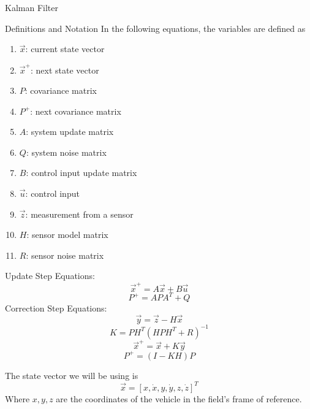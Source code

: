 \documentclass[12pt]{article}
\begin{document}
\begin{section}{Kalman Filter}
\begin{subsection}{Definitions and Notation}
In the following equations, the variables are defined as
\begin{enumerate}
\item $\vec{x}$: current state vector
\item $\vec{x}^+$: next state vector
\item $P$: covariance matrix
\item $P^+$: next covariance matrix
\item $A$: system update matrix
\item $Q$: system noise matrix
\item $B$: control input update matrix
\item $\vec{u}$: control input
\item $\vec{z}$: measurement from a sensor
\item $H$: sensor model matrix
\item $R$: sensor noise matrix
\end{enumerate}
Update Step Equations:
\begin{equation}
\vec{x}^+ = A\vec{x} + B\vec{u}
\end{equation}
\begin{equation}
P^+ = APA^T + Q
\end{equation}
Correction Step Equations:
\begin{equation}
\vec{y} = \vec{z} - H\vec{x}
\end{equation}
\begin{equation}
K = PH^T(HPH^T+R)^{-1}
\end{equation}
\begin{equation}
\vec{x}^+ = \vec{x} + K\vec{y}
\end{equation}
\begin{equation}
P^+ = (I - KH)P
\end{equation}


The state vector we will be using is
\begin{equation}
\vec{x} = [x,\dot{x},y,\dot{y},z,\dot{z}]^T
\end{equation}
Where $x,y,z$ are the coordinates of the vehicle in the field's frame of reference.


\end{subsection}


\end{section}
\end{document}
